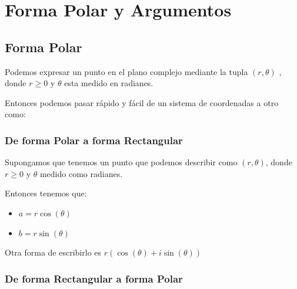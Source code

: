 \documentclass[12pt, fleqn]{report}                             %
\newcommand{\Wrap}[1]{\left( #1 \right)}                        %
\newcommand{\Cos}[1]{\cos\Wrap{#1}}                             %
\newcommand{\Sin}[1]{\sin\Wrap{#1}}                             %
\begin{document}
    \chapter{Forma Polar y Argumentos}

        \clearpage
        \section{Forma Polar}
            
            Podemos expresar un punto en el plano complejo mediante la tupla $(r, \theta)$ , donde
            $r \geq 0$ y $\theta$ esta medido en radianes.

            Entonces podemos pasar rápido y fácil de un sistema de coordenadas a otro como:

            \subsection{De forma Polar a forma Rectangular}

                Supongamos que tenemos un punto que podemos describir como $(r, \theta)$,
                donde $r \geq 0$ y $\theta$ medido como radianes.

                Entonces tenemos que:

                \begin{itemize}
                     \item $a = r \Cos{\theta}$
                     \item $b = r \Sin{\theta}$
                 \end{itemize}

                 Otra forma de escribirlo es $r(\Cos{\theta} + i\Sin{\theta})$

            \subsection{De forma Rectangular a forma Polar}
\end{document}
